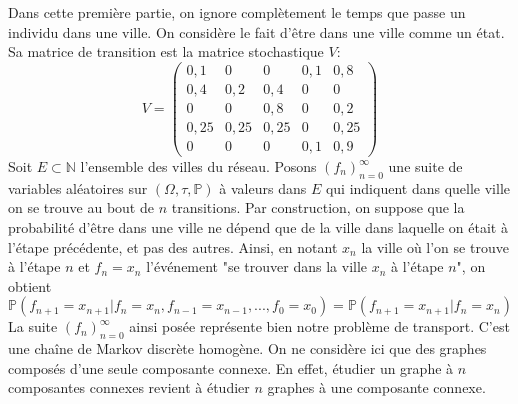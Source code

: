 \documentclass[a4paper]{article}
\theoremstyle{plain}
\theoremstyle{definition}
\theoremstyle{remark}
\begin{document}
Dans cette première partie, on ignore complètement le temps que passe un individu dans une ville. On considère le fait d'être dans une ville comme un état.\\

Sa matrice de transition est la matrice stochastique $V$:
$$
V=\begin{pmatrix}
0,1 &0& 0& 0,1 & 0,8\\
0,4 &0,2& 0,4& 0 & 0\\
0 &0& 0,8& 0 & 0,2\\
0,25 &0,25& 0,25& 0 & 0,25\\
0 &0& 0& 0,1 & 0,9
\end{pmatrix}
$$
Soit $E\subset\mathbb{N}$ l'ensemble des villes du réseau. Posons $(f_n)_{n=0}^{\infty}$ une suite de variables aléatoires sur $(\Omega, \tau, \mathbb{P})$ à valeurs dans $E$ qui indiquent dans quelle ville on se trouve au bout de $n$ transitions. Par construction, on suppose que la probabilité d'être dans une ville ne dépend que de la ville dans laquelle on était à l'étape précédente, et pas des autres. Ainsi, en notant $x_n$ la ville où l'on se trouve à l'étape $n$ et $f_n=x_n$ l'événement "se trouver dans la ville $x_n$ à l'étape $n$", on obtient
 $$\mathbb{P}(f_{n+1}=x_{n+1}|f_{n}=x_{n},f_{n-1}=x_{n-1},...,f_{0}=x_{0})=\mathbb{P}(f_{n+1}=x_{n+1}|f_{n}=x_{n})$$
La suite $(f_n)_{n=0}^{\infty}$ ainsi posée représente bien notre problème de transport. C'est une chaîne de Markov discrète homogène.
On ne considère ici que des graphes composés d'une seule composante connexe. En effet, étudier un graphe à $n$ composantes connexes revient à étudier $n$ graphes à une composante connexe.
\end{document}
